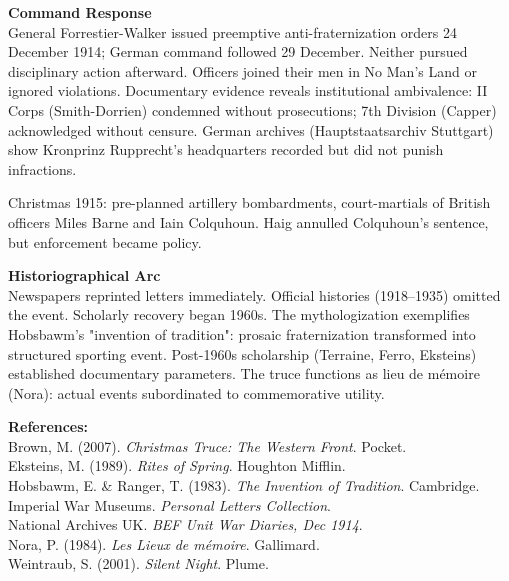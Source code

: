 \begin{technical}
\noindent\textbf{Command Response}\\[0.5em]
General Forrestier-Walker issued preemptive anti-fraternization orders 24 December 1914; German command followed 29 December. Neither pursued disciplinary action afterward. Officers joined their men in No Man's Land or ignored violations. Documentary evidence reveals institutional ambivalence: II Corps (Smith-Dorrien) condemned without prosecutions; 7th Division (Capper) acknowledged without censure. German archives (Hauptstaatsarchiv Stuttgart) show Kronprinz Rupprecht's headquarters recorded but did not punish infractions.

Christmas 1915: pre-planned artillery bombardments, court-martials of British officers Miles Barne and Iain Colquhoun. Haig annulled Colquhoun's sentence, but enforcement became policy. 

\noindent\textbf{Historiographical Arc}\\[0.5em]
Newspapers reprinted letters immediately. Official histories (1918–1935) omitted the event. Scholarly recovery began 1960s. The mythologization exemplifies Hobsbawm's "invention of tradition": prosaic fraternization transformed into structured sporting event. Post-1960s scholarship (Terraine, Ferro, Eksteins) established documentary parameters. The truce functions as lieu de mémoire (Nora): actual events subordinated to commemorative utility.

\vspace{0.5em}
\noindent\textbf{References:}\\
Brown, M. (2007). \textit{Christmas Truce: The Western Front}. Pocket.\\
Eksteins, M. (1989). \textit{Rites of Spring}. Houghton Mifflin.\\
Hobsbawm, E. \& Ranger, T. (1983). \textit{The Invention of Tradition}. Cambridge.\\
Imperial War Museums. \textit{Personal Letters Collection}.\\
National Archives UK. \textit{BEF Unit War Diaries, Dec 1914}.\\
Nora, P. (1984). \textit{Les Lieux de mémoire}. Gallimard.\\
Weintraub, S. (2001). \textit{Silent Night}. Plume.
\end{technical}

